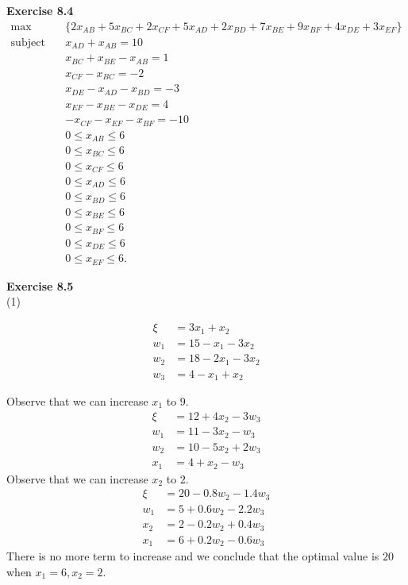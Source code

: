 \documentclass[letterpaper,12pt]{article}
\theoremstyle{definition}
\begin{document}
\noindent\textbf{Exercise 8.4} \\
\begin{align*}
  \max &\{2x_{AB} + 5x_{BC} + 2x_{CF} + 5x_{AD} + 2x_{BD} + 7x_{BE} + 9x_{BF} + 4x_{DE} +3x_{EF}\} \\
  \text{subject to } &x_{AD} + x_{AB} = 10 \\
  &x_{BC} + x_{BE} - x_{AB} = 1 \\
  &x_{CF} - x_{BC} = -2 \\
  &x_{DE} - x_{AD} - x_{BD} = -3 \\
  &x_{EF} - x_{BE} - x_{DE} = 4 \\
  &-x_{CF} - x_{EF} - x_{BF} = -10 \\
  &0\leq x_{AB} \leq 6 \\
  &0\leq x_{BC} \leq 6 \\
  &0\leq x_{CF} \leq 6 \\
  &0\leq x_{AD} \leq 6 \\
  &0\leq x_{BD} \leq 6 \\
  &0\leq x_{BE} \leq 6 \\
  &0\leq x_{BF} \leq 6 \\
  &0\leq x_{DE} \leq 6 \\
  &0\leq x_{EF} \leq 6.
\end{align*}

\noindent\textbf{Exercise 8.5} \\
(1)

\begin{align*}
  \xi &= 3x_1 + x_2 \\
  w_1 &= 15 - x_1 - 3x_2\\
  w_2 &= 18 - 2x_1 - 3x_2 \\
  w_3 &= 4 - x_1 + x_2
\end{align*}

Observe that we can increase $x_1$ to $9.$
\begin{align*}
  \xi &= 12 + 4x_2 - 3w_3 \\
  w_1 &= 11 - 3x_2 - w_3  \\
  w_2 &= 10 - 5x_2 + 2w_3 \\
  x_1 &= 4 + x_2 - w_3
\end{align*}
Observe that we can increase $x_2$ to $2.$
\begin{align*}
  \xi &= 20 - 0.8w_2 - 1.4w_3 \\
  w_1 &= 5 + 0.6 w_2 - 2.2 w_3 \\
  x_2 &= 2 - 0.2w_2 + 0.4w_3 \\
  x_1 &= 6 + 0.2w_2 - 0.6w_3
\end{align*}
There is no more term to increase and we conclude that the optimal value is $20$ when $x_1 = 6, x_2 =2.$
\end{document}
